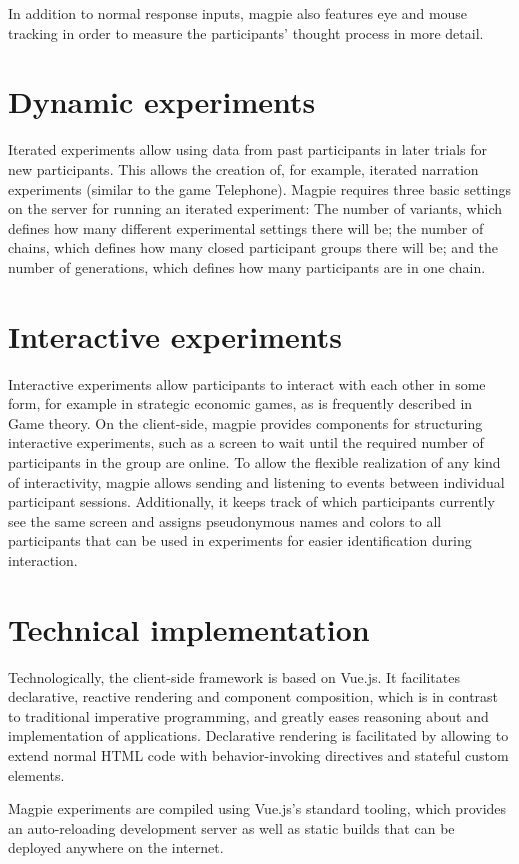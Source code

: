 \documentclass[a4paper,11pt]{scrreprt}
\begin{document}
In addition to normal response inputs, magpie also features eye and mouse tracking in order to measure the participants' thought process in more detail.

\section{Dynamic experiments}
Iterated experiments allow using data from past participants in later trials for new participants. This allows the creation of, for example, iterated narration experiments (similar to the game Telephone).
Magpie requires three basic settings on the server for running an iterated experiment: The number of variants, which defines how many different experimental settings there will be; the number of chains, which defines how many closed participant groups there will be; and the number of generations, which defines how many participants are in one chain.

\section{Interactive experiments}
Interactive experiments allow participants to interact with each other in some form, for example in strategic economic games, as is frequently described in Game theory. On the client-side, magpie provides components for structuring interactive experiments, such as a screen to wait until the required number of participants in the group are online. To allow the flexible realization of any kind of interactivity, magpie allows sending and listening to events between individual participant sessions. Additionally, it keeps track of which participants currently see the same screen and assigns pseudonymous names and colors to all participants that can be used in experiments for easier identification during interaction.

\section{Technical implementation}
Technologically, the client-side framework is based on Vue.js. It facilitates declarative, reactive rendering and component composition, which is in contrast to traditional imperative programming, and greatly eases reasoning about and implementation of applications. Declarative rendering is facilitated by allowing to extend normal HTML code with behavior-invoking directives and stateful custom elements.

Magpie experiments are compiled using Vue.js's standard tooling, which provides an auto-reloading development server as well as static builds that can be deployed anywhere on the internet.
\end{document}
